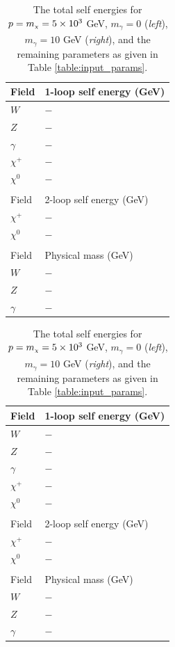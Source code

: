 \documentclass[11pt]{article}
\newcommand{\mychi}{\raisebox{0pt}[1ex][1ex]{\tiny$\chi$}}
\def\mc{m_{\mychi}}
\begin{document}
\begin{table}[h!]
\caption{The total self energies for $p=\mc=5\times10^3$ GeV, $m_{\gamma}=0$ (\textit{left}), $m_{\gamma}=10$ GeV (\textit{right}), and the remaining parameters as given in Table \ref{table:input_params}.}\label{table:output_params}
\centering
\vspace{0.5cm}
\begin{tabular}{l l}
\hline
Field & 1-loop self energy (GeV)\\
\hline
$W$ & $-$ \\
$Z$ & $-$  \\
$\gamma$ & $-$ \\
$\chi^+$ & $-$ \\
$\chi^0$ & $-$ \\
&\\
\hline
Field & 2-loop self energy (GeV)\\
\hline
$\chi^+$ & $-$ \\
$\chi^0$ & $-$ \\
&\\
\hline
Field & Physical mass (GeV)\\
\hline
$W$ & $-$ \\
$Z$ & $-$  \\
$\gamma$ & $-$\\
\hline\end{tabular}
\hspace{3cm}
\begin{tabular}{l l}
\hline
Field & 1-loop self energy (GeV)\\
\hline
$W$ & $-$ \\
$Z$ & $-$  \\
$\gamma$ & $-$ \\
$\chi^+$ & $-$ \\
$\chi^0$ & $-$ \\
&\\
\hline
Field & 2-loop self energy (GeV)\\
\hline
$\chi^+$ & $-$ \\
$\chi^0$ & $-$ \\
&\\
\hline
Field & Physical mass (GeV)\\
\hline
$W$ & $-$ \\
$Z$ & $-$  \\
$\gamma$ & $-$\\
\hline\end{tabular}
\end{table}
\end{document}
